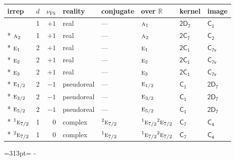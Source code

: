\documentclass[10pt,a4paper]{article}
\makeatletter
\def\grouprule#1#2{\noalign{\marks\LTgroupmarks{\the\belowrulesep}\nobreak\vskip#1%
  \vskip\aboverulesep}\multispan\LT@cols\unskip{\leaders\hrule\@height#2\hfill\kern\z@}\cr
  \noalign{\penalty\LTrulebreak\vskip\belowrulesep\global\@lastruleclass\z@}}
\newcommand{\needspace}[1]{\par\penalty-100\begingroup\dimen0=#1\relax\dimen2=\pagegoal
  \advance\dimen2-\pagetotal\ifdim\dimen0>\dimen2\relax\ifdim\dimen2>0pt\vfil\break\fi\fi
  \endgroup}
\numberwithin{equation}{section}
\newcommand{\grp}[1]{\mathsf{#1}}
\newcommand{\irr}[1]{\text{\normalfont\scshape #1}}
\newcommand{\conjpair}[1]{{}^{#1}}
\newcommand{\detbox}[1]{{\setlength{\fboxsep}{1pt}\fbox{#1}}}
\newcommand{\fsind}{\nu_{\mathrm{FS}}}
\makeatother
\begin{document}
{\small\renewcommand{\arraystretch}{1.25}\setlength{\tabcolsep}{4pt}\begin{longtable}{@{}lrrlllll@{}}\toprule
irrep & $d$ & $\fsind$ & reality & conjugate & over $\mathbb{R}$ & kernel & image\\\midrule\endhead
\bottomrule\endfoot\endlastfoot
\detbox{$\irr{a}_{1}$} & 1 & $+1$ & real & --- & $\irr{a}_{1}$ & \href{2D7.pdf}{$\grp{2D_{7}}$} & \href{../../../rotation/data/pdf/C1.pdf}{$\grp{C_{1}}$}\\*
$\irr{a}_{2}$ & 1 & $+1$ & real & --- & $\irr{a}_{2}$ & \href{2C7.pdf}{$\grp{2C_{7}}$} & \href{../../../rotation/data/pdf/C2.pdf}{$\grp{C_{2}}$}\\*
$\irr{e}_{1}$ & 2 & $+1$ & real & --- & $\irr{e}_{1}$ & \href{2C1.pdf}{$\grp{2C_{1}}$} & \href{../../../rotation/data/pdf/C7v.pdf}{$\grp{C_{7v}}$}\\*
$\irr{e}_{2}$ & 2 & $+1$ & real & --- & $\irr{e}_{2}$ & \href{2C1.pdf}{$\grp{2C_{1}}$} & \href{../../../rotation/data/pdf/C7v.pdf}{$\grp{C_{7v}}$}\\*
$\irr{e}_{3}$ & 2 & $+1$ & real & --- & $\irr{e}_{3}$ & \href{2C1.pdf}{$\grp{2C_{1}}$} & \href{../../../rotation/data/pdf/C7v.pdf}{$\grp{C_{7v}}$}\\*
\grouprule{0pt}{\lightrulewidth}
$\irr{e}_{1/2}$ & 2 & $-1$ & pseudoreal & --- & $\irr{e}_{1/2}$ & \href{C1.pdf}{$\grp{C_{1}}$} & \href{2D7.pdf}{$\grp{2D_{7}}$}\\*
$\irr{e}_{3/2}$ & 2 & $-1$ & pseudoreal & --- & $\irr{e}_{3/2}$ & \href{C1.pdf}{$\grp{C_{1}}$} & \href{2D7.pdf}{$\grp{2D_{7}}$}\\*
$\irr{e}_{5/2}$ & 2 & $-1$ & pseudoreal & --- & $\irr{e}_{5/2}$ & \href{C1.pdf}{$\grp{C_{1}}$} & \href{2D7.pdf}{$\grp{2D_{7}}$}\\*
$\conjpair{1}\irr{e}_{7/2}$ & 1 & $0$ & complex & $\conjpair{2}\irr{e}_{7/2}$ & $\conjpair{1}\irr{e}_{7/2}\conjpair{2}\irr{e}_{7/2}$ & \href{C7.pdf}{$\grp{C_{7}}$} & \href{../../../rotation/data/pdf/C4.pdf}{$\grp{C_{4}}$}\\*
$\conjpair{2}\irr{e}_{7/2}$ & 1 & $0$ & complex & $\conjpair{1}\irr{e}_{7/2}$ & $\conjpair{1}\irr{e}_{7/2}\conjpair{2}\irr{e}_{7/2}$ & \href{C7.pdf}{$\grp{C_{7}}$} & \href{../../../rotation/data/pdf/C4.pdf}{$\grp{C_{4}}$}\\
\bottomrule\end{longtable}}
\needspace{313pt}
\end{document}
